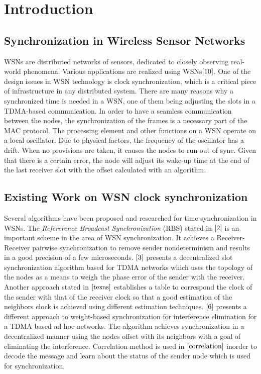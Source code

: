 \documentclass[journal]{IEEEtran}
\begin{document}
\section{\textbf{Introduction}}
\subsection{\textbf{Synchronization in Wireless Sensor Networks}}
WSNs are distributed networks of sensors, dedicated to closely observing real-world phenomena. Various applications are realized using WSNs$\cite{10}$.
One of the design issues in WSN technology is clock
synchronization, which is a critical piece of infrastructure in any
distributed system. There are many reasons why a synchronized time is needed in a WSN, one of them being adjusting the slots in a TDMA-based communication. \newline
In order to have a seamless communication between the nodes, the
synchronization of the frames is a necessary part of the MAC
protocol. The processing element and other functions on a WSN
operate on a local oscillator. Due to physical factors, the
frequency of the oscillator has a drift. When no provisions are
taken, it causes the nodes to run out of sync. Given that there is a
certain error, the node will adjust its wake-up time at the end of
the last receiver slot with the offset calculated with an algorithm.
\subsection{\textbf{Existing Work on WSN clock synchronization}}
\noindent Several algorithms have been proposed and researched for time synchronization in WSNs. The \textit{Refererence Broadcast Synchronization} (RBS) stated in $\cite{2}$ is an important scheme in the area of WSN synchronization. It achieves a Receiver-Receiver pairwise synchronization to remove sender nondeterminism and results in a good precision of a few microseconds. $\cite{3}$ presents a decentralized slot synchronization algorithm based for TDMA networks which uses the topology of the nodes as a means to weigh the phase error of the sender with the receiver. \newline 
Another approach stated in $\cite{texas}$ establishes a table to correspond the clock of the sender with that of the receiver clock so that a good estimation of the neighbors clock is achieved using different estimation techniques. $\cite{6}$ presents a different approach to weight-based synchronization for interference elimination for a TDMA based ad-hoc networks. The algorithm achieves synchronization in a decentralized manner using the nodes offset with its neighbors with a goal of eliminating the interference. Correlation method is used in $\cite{correlation}$ inorder to decode the message and learn about the status of the sender node which is used for synchronization.
\end{document}
